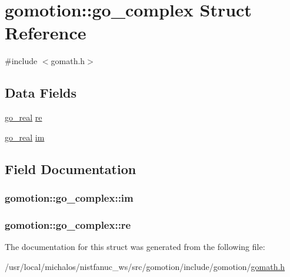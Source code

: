\hypertarget{structgomotion_1_1go__complex}{\section{gomotion\-:\-:go\-\_\-complex Struct Reference}
\label{structgomotion_1_1go__complex}
}


{\ttfamily \#include $<$gomath.\-h$>$}

\subsection*{Data Fields}
\begin{DoxyCompactItemize}
\item 
\hyperlink{gotypes_8h_afd666a2393eebd71ee455846ac9def9b}{go\-\_\-real} \hyperlink{structgomotion_1_1go__complex_a0c57ecf25c09bb70a15927561479a4f0}{re}
\item 
\hyperlink{gotypes_8h_afd666a2393eebd71ee455846ac9def9b}{go\-\_\-real} \hyperlink{structgomotion_1_1go__complex_aea706b95ca0df1b7370e3edd6321c8f3}{im}
\end{DoxyCompactItemize}


\subsection{Field Documentation}
\hypertarget{structgomotion_1_1go__complex_aea706b95ca0df1b7370e3edd6321c8f3}{
\subsubsection[{im}]{ gomotion\-::go\-\_\-complex\-::im}}\label{structgomotion_1_1go__complex_aea706b95ca0df1b7370e3edd6321c8f3}
\hypertarget{structgomotion_1_1go__complex_a0c57ecf25c09bb70a15927561479a4f0}{
\subsubsection[{re}]{ gomotion\-::go\-\_\-complex\-::re}}\label{structgomotion_1_1go__complex_a0c57ecf25c09bb70a15927561479a4f0}


The documentation for this struct was generated from the following file\-:\begin{DoxyCompactItemize}
\item 
/usr/local/michalos/nistfanuc\-\_\-ws/src/gomotion/include/gomotion/\hyperlink{gomath_8h}{gomath.\-h}\end{DoxyCompactItemize}
